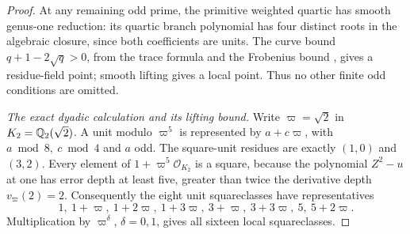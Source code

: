 \begin{proof}
At any remaining odd prime, the primitive weighted
quartic has smooth genus-one reduction: its quartic
branch polynomial has four distinct roots in the
algebraic closure, since both coefficients are units.
The curve bound
\(q+1-2\sqrt q>0\), from the trace formula and
the Frobenius bound
\cite[(1.5.1), Theorem (1.6)]{AgentDeligneWeilI},
gives a residue-field point; smooth lifting gives a
local point.  Thus no other finite odd conditions
are omitted.

\emph{The exact dyadic calculation and its lifting bound.}
Write \(\varpi=\sqrt2\) in \(K_2=\mathbb Q_2(\sqrt2)\).
A unit modulo \(\varpi^5\) is represented by
\(a+c\varpi\), with \(a\bmod8,\ c\bmod4\) and \(a\) odd.
The square-unit residues are exactly
\((1,0)\) and \((3,2)\).
Every element of \(1+\varpi^5\mathcal O_{K_2}\) is a
square, because the polynomial \(Z^2-u\) at one has
error depth at least five, greater than twice the
derivative depth \(v_\varpi(2)=2\).
Consequently the eight unit squareclasses have representatives
\[
        1,\ 1+\varpi,\ 1+2\varpi,\ 1+3\varpi,\
        3+\varpi,\ 3+3\varpi,\ 5,\ 5+2\varpi .
\tag{A.150.25}
\]
Multiplication by \(\varpi^\delta\), \(\delta=0,1\),
gives all sixteen local squareclasses.


\end{proof}

